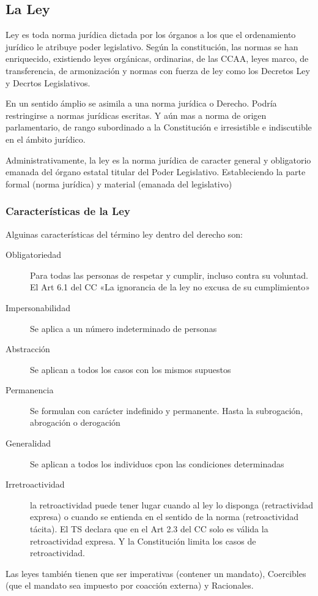 \subsection{La Ley} %
    Ley es toda norma jurídica dictada por los órganos a los que el ordenamiento jurídico le atribuye poder legislativo. Según la constitución, las normas se han enriquecido, existiendo leyes orgánicas, ordinarias, de las CCAA, leyes marco, de transferencia, de armonización y normas con fuerza de ley como los Decretos Ley y Decrtos Legislativos.

    En un sentido ámplio se asimila a una norma jurídica o Derecho. Podría restringirse a normas jurídicas escritas. Y aún mas a norma de origen parlamentario, de rango subordinado a la Constitución e irresistible e indiscutible en el ámbito jurídico.

    Administrativamente, la ley es la norma jurídica de caracter general y obligatorio emanada del órgano estatal titular del Poder Legislativo. Estableciendo la parte formal (norma jurídica) y material (emanada del legislativo)

    \subsubsection{Características de la Ley}
        Alguinas características del término ley dentro del derecho son:
        \begin{description}
            \item[Obligatoriedad] Para todas las personas de respetar y cumplir, incluso contra su voluntad. El Art 6.1 del CC «La ignorancia de la ley no excusa de su cumplimiento»
            \item[Impersonabilidad] Se aplica a un número indeterminado de personas
            \item[Abstracción] Se aplican a todos los casos con los mismos supuestos
            \item[Permanencia] Se formulan con carácter indefinido y permanente. Hasta la subrogación, abrogación o derogación
            \item[Generalidad] Se aplican a todos los individuos cpon las condiciones determinadas
            \item[Irretroactividad] la retroactividad puede tener lugar cuando al ley lo disponga (retractividad expresa) o cuando se entienda en el sentido de la norma (retroactividad tácita). El TS declara que en el Art 2.3 del CC solo es válida la retroactividad expresa. Y la Constitución limita los casos de retroactividad.
        \end{description}
        Las leyes también tienen que ser imperativas (contener un mandato), Coercibles (que el mandato sea impuesto por coacción externa) y Racionales.

